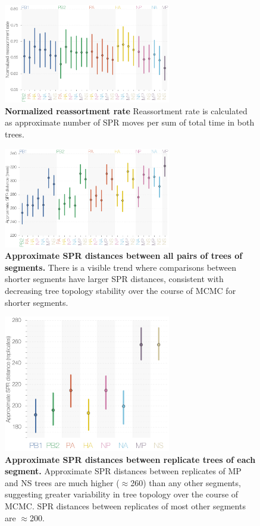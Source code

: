\documentclass[11pt,oneside,letterpaper]{article}
\begin{document}
\begin{figure}
\centering  
\includegraphics[width=0.65\textwidth]  {supp_figures/InfB_supp_normRErate.png}
\caption{\textbf{Normalized reassortment rate}
Reassortment rate is calculated as approximate number of SPR moves per sum of total time in both trees.}
\label{NormSPR_RErate}
\end{figure}

\begin{figure}
\centering  
\includegraphics[width=0.65\textwidth]  {supp_figures/InfB_supp_aSPRdistances_trees.png}
\caption{\textbf{Approximate SPR distances between all pairs of trees of segments.}
There is a visible trend where comparisons between shorter segments have larger SPR distances, consistent with decreasing tree topology stability over the course of MCMC for shorter segments.}
\label{SPRdistancesTrees}
\end{figure}

\begin{figure}
\centering  
\includegraphics[width=0.65\textwidth]  {supp_figures/InfB_supp_aSPRdistances_replicates.png}
\caption{\textbf{Approximate SPR distances between replicate trees of each segment.}
Approximate SPR distances between replicates of MP and NS trees are much higher ($\approx$260) than any other segments, suggesting greater variability in tree topology over the course of MCMC.
SPR distances between replicates of most other segments are $\approx$200.
}
\label{SPRdistancesReplicates}
\end{figure}
\end{document}
